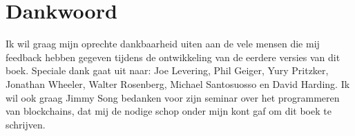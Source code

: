
\chapter*{Dankwoord}

\vspace{-3\baselineskip}

Ik wil graag mijn oprechte dankbaarheid uiten aan de vele mensen die mij feedback hebben gegeven tijdens de ontwikkeling van de eerdere versies van dit boek. Speciale dank gaat uit naar: Joe Levering, Phil Geiger, Yury Pritzker, Jonathan Wheeler, Walter Rosenberg, Michael Santosuosso en David Harding. Ik wil ook graag Jimmy Song bedanken voor zijn seminar over het programmeren van blockchains, dat mij de nodige schop onder mijn kont gaf om dit boek te schrijven.
